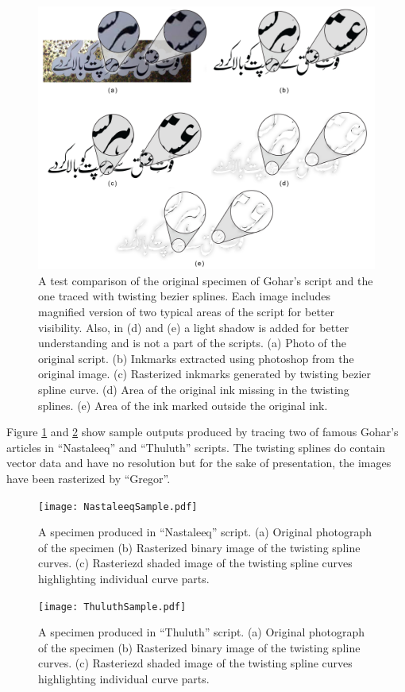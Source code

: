\begin{figure}
  \centering
  \includegraphics[width=1\textwidth]{InkComparison.jpg}
  \caption{A test comparison of the original specimen of Gohar's script and the one traced with twisting bezier splines. Each image includes magnified version of two typical areas of the script for better visibility. Also, in (d) and (e) a light shadow is added for better understanding and is not a part of the scripts. (a) Photo of the original script. (b) Inkmarks extracted using photoshop from the original image. (c) Rasterized inkmarks generated by twisting bezier spline curve. (d) Area of the original ink missing in the twisting splines. (e) Area of the ink marked outside the original ink.
  } 
  
\end{figure}
        
Figure \ref{Fig:Nastaleeq} and \ref{Fig:Thuluth} show sample outputs produced by tracing two of famous Gohar's articles in ``Nastaleeq'' and ``Thuluth'' scripts. The twisting splines do contain vector data and have no resolution but for the sake of presentation, the images have been rasterized by ``Gregor''.
\begin{figure}
  \centering
  \texttt{[image: NastaleeqSample.pdf]}
  \caption{A specimen produced in ``Nastaleeq'' script. (a) Original photograph of the specimen (b) Rasterized binary image of the twisting spline curves. (c) Rasteriezd shaded image of the twisting spline curves highlighting individual curve parts.} 
  \label{Fig:Nastaleeq}
\end{figure}     

\begin{figure}
  \centering
  \texttt{[image: ThuluthSample.pdf]}
  \caption{A specimen produced in ``Thuluth'' script. (a) Original photograph of the specimen (b) Rasterized binary image of the twisting spline curves. (c) Rasteriezd shaded image of the twisting spline curves highlighting individual curve parts.
  }
  \label{Fig:Thuluth}
\end{figure}     

\clearpage        